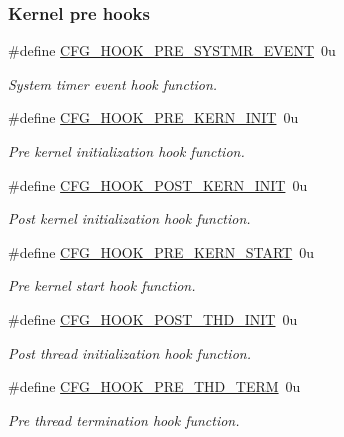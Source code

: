 \subsubsection*{Kernel pre hooks}
\begin{DoxyCompactItemize}
\item 
\#define \hyperlink{group__kern__cfg_gaa130bc9f72010b44b4b06618d8f8d0bc}{C\-F\-G\-\_\-\-H\-O\-O\-K\-\_\-\-P\-R\-E\-\_\-\-S\-Y\-S\-T\-M\-R\-\_\-\-E\-V\-E\-N\-T}~0u
\begin{DoxyCompactList}\small\item\em System timer event hook function. \end{DoxyCompactList}\item 
\#define \hyperlink{group__kern__cfg_ga4093113f2105d2716f86c6509a6e643a}{C\-F\-G\-\_\-\-H\-O\-O\-K\-\_\-\-P\-R\-E\-\_\-\-K\-E\-R\-N\-\_\-\-I\-N\-I\-T}~0u
\begin{DoxyCompactList}\small\item\em Pre kernel initialization hook function. \end{DoxyCompactList}\item 
\#define \hyperlink{group__kern__cfg_ga85dea823714335c2ec9e9f7750996e83}{C\-F\-G\-\_\-\-H\-O\-O\-K\-\_\-\-P\-O\-S\-T\-\_\-\-K\-E\-R\-N\-\_\-\-I\-N\-I\-T}~0u
\begin{DoxyCompactList}\small\item\em Post kernel initialization hook function. \end{DoxyCompactList}\item 
\#define \hyperlink{group__kern__cfg_gad67d998118375811b0f3e63543311661}{C\-F\-G\-\_\-\-H\-O\-O\-K\-\_\-\-P\-R\-E\-\_\-\-K\-E\-R\-N\-\_\-\-S\-T\-A\-R\-T}~0u
\begin{DoxyCompactList}\small\item\em Pre kernel start hook function. \end{DoxyCompactList}\item 
\#define \hyperlink{group__kern__cfg_ga23deae306171d1a8dda4d0e33efdb6bb}{C\-F\-G\-\_\-\-H\-O\-O\-K\-\_\-\-P\-O\-S\-T\-\_\-\-T\-H\-D\-\_\-\-I\-N\-I\-T}~0u
\begin{DoxyCompactList}\small\item\em Post thread initialization hook function. \end{DoxyCompactList}\item 
\#define \hyperlink{group__kern__cfg_ga9c7dd4e009a89e9cffb0f9b404bc6250}{C\-F\-G\-\_\-\-H\-O\-O\-K\-\_\-\-P\-R\-E\-\_\-\-T\-H\-D\-\_\-\-T\-E\-R\-M}~0u
\begin{DoxyCompactList}\small\item\em Pre thread termination hook function. \end{DoxyCompactList}\item 

\end{DoxyCompactItemize}
